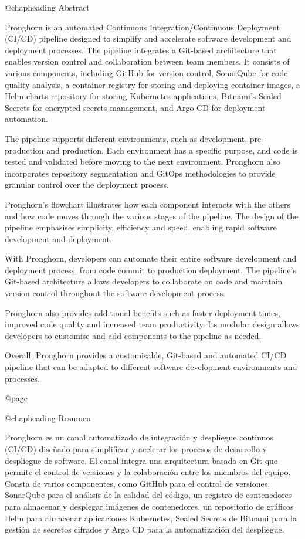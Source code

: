 @chapheading Abstract

Pronghorn is an automated Continuous Integration/Continuous Deployment (CI/CD) pipeline designed to simplify and accelerate software development and deployment processes. The pipeline integrates a Git-based architecture that enables version control and collaboration between team members. It consists of various components, including GitHub for version control, SonarQube for code quality analysis, a container registry for storing and deploying container images, a Helm charts repository for storing Kubernetes applications, Bitnami's Sealed Secrets for encrypted secrets management, and Argo CD for deployment automation.

The pipeline supports different environments, such as development, pre-production and production. Each environment has a specific purpose, and code is tested and validated before moving to the next environment. Pronghorn also incorporates repository segmentation and GitOps methodologies to provide granular control over the deployment process.

Pronghorn's flowchart illustrates how each component interacts with the others and how code moves through the various stages of the pipeline. The design of the pipeline emphasises simplicity, efficiency and speed, enabling rapid software development and deployment.

With Pronghorn, developers can automate their entire software development and deployment process, from code commit to production deployment. The pipeline's Git-based architecture allows developers to collaborate on code and maintain version control throughout the software development process.

Pronghorn also provides additional benefits such as faster deployment times, improved code quality and increased team productivity. Its modular design allows developers to customise and add components to the pipeline as needed.

Overall, Pronghorn provides a customisable, Git-based and automated CI/CD pipeline that can be adapted to different software development environments and processes.

@page

@chapheading Resumen

Pronghorn es un canal automatizado de integración y despliegue continuos (CI/CD) diseñado para simplificar y acelerar los procesos de desarrollo y despliegue de software. El canal integra una arquitectura basada en Git que permite el control de versiones y la colaboración entre los miembros del equipo. Consta de varios componentes, como GitHub para el control de versiones, SonarQube para el análisis de la calidad del código, un registro de contenedores para almacenar y desplegar imágenes de contenedores, un repositorio de gráficos Helm para almacenar aplicaciones Kubernetes, Sealed Secrets de Bitnami para la gestión de secretos cifrados y Argo CD para la automatización del despliegue.

